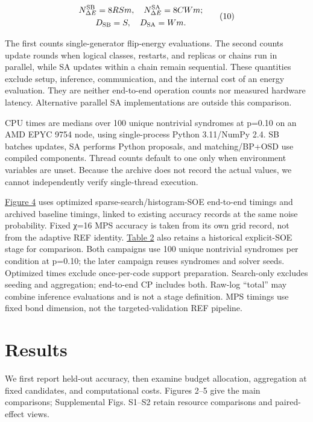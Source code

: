 \documentclass[aps,prapplied,reprint,superscriptaddress,amsmath,amssymb,floatfix,nofootinbib]{revtex4-2}
\begin{document}
\[
\begin{gathered}
N_{\Delta E}^{\rm SB}=8RSm,\quad
N_{\Delta E}^{\rm SA}=8CWm;\\
D_{\rm SB}=S,\quad D_{\rm SA}=Wm.
\end{gathered}
\tag{10}\label{eq:10}
\]

The first counts single-generator flip-energy evaluations. The second
counts update rounds when logical classes, restarts, and replicas or
chains run in parallel, while SA updates within a chain remain
sequential. These quantities exclude setup, inference, communication,
and the internal cost of an energy evaluation. They are neither
end-to-end operation counts nor measured hardware latency. Alternative
parallel SA implementations are outside this comparison.

CPU times are medians over 100 unique nontrivial syndromes at p=0.10 on
an AMD EPYC 9754 node, using single-process Python 3.11/NumPy 2.4. SB
batches updates, SA performs Python proposals, and matching/BP+OSD use
compiled components. Thread counts default to one only when environment
variables are unset. Because the archive does not record the actual
values, we cannot independently verify single-thread execution.

\hyperref[fig:4]{Figure 4} uses optimized sparse-search/histogram-SOE end-to-end timings
and archived baseline timings, linked to existing accuracy records at
the same noise probability. Fixed χ=16 MPS accuracy is taken from its
own grid record, not from the adaptive REF identity. \hyperref[tab:2]{Table 2} also
retains a historical explicit-SOE stage for comparison. Both campaigns
use 100 unique nontrivial syndromes per condition at p=0.10; the later
campaign reuses syndromes and solver seeds. Optimized times exclude
once-per-code support preparation. Search-only excludes seeding and
aggregation; end-to-end CP includes both. Raw-log ``total'' may combine
inference evaluations and is not a stage definition. MPS timings use
fixed bond dimension, not the targeted-validation REF pipeline.

\section{Results}\label{iv.-results}

We first report held-out accuracy, then examine budget allocation,
aggregation at fixed candidates, and computational costs. Figures 2--5
give the main comparisons; Supplemental Figs. S1--S2 retain resource
comparisons and paired-effect views.
\end{document}

